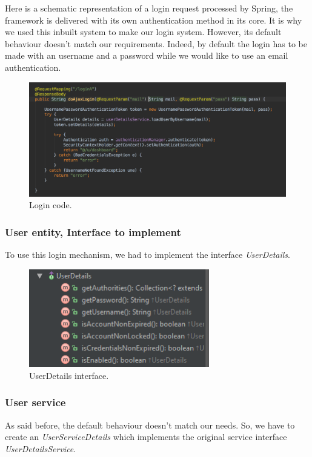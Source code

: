 Here is a schematic representation of a login request processed by Spring, the framework is delivered with its own authentication method in its core. It is why we used this inbuilt system to make our login system. However, its default behaviour doesn't match our requirements. Indeed, by default the login has to be made with an username and a password while we would like to use an email authentication. 

\begin{figure}[H]
  \caption{Login code.}
  \centering
    \includegraphics[width=1\textwidth]{img/loginCode.png}
\end{figure}

\subsubsection{User entity, Interface to implement}
To use this login mechanism, we had to implement the interface \textit{UserDetails}. 

\begin{figure}[H]
  \caption{UserDetails interface.}
  \centering
    \includegraphics[width=0.7\textwidth]{img/userdetails.png}
\end{figure}

\subsubsection{User service}
As said before, the default behaviour doesn't match our needs. So, we have to create an \textit{UserServiceDetails} which implements the original service interface \textit{UserDetailsService}.

